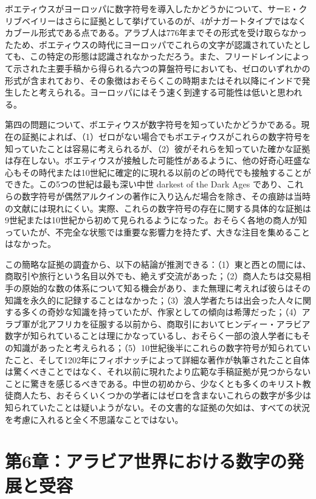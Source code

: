 \documentclass[a4paper,11pt,openany]{ltjsbook}
\begin{document}
ボエティウスがヨーロッパに数字符号を導入したかどうかについて、サーE・クリブベイリーはさらに証拠として挙げているのが、4がナガートタイプではなくカブール形式である点である。アラブ人は776年までその形式を受け取らなかったため、ボエティウスの時代にヨーロッパでこれらの文字が認識されていたとしても、この特定の形態は認識されなかっただろう。また、フリードレインによって示された主要手稿から得られる六つの算盤符号においても、ゼロのいずれかの形式が含まれており、その象徴はおそらくこの時期またはそれ以降にインドで発生したと考えられる。ヨーロッパにはそう速く到達する可能性は低いと思われる。

第四の問題について、ボエティウスが数字符号を知っていたかどうかである。現在の証拠によれば、（1）ゼロがない場合でもボエティウスがこれらの数字符号を知っていたことは容易に考えられるが、（2）彼がそれらを知っていた確かな証拠は存在しない。ボエティウスが接触した可能性があるように、他の好奇心旺盛な心もその時代または10世紀に確定的に現れる以前のどの時代でも接触することができた。この5つの世紀は最も深い中世 darkest of the Dark Ages であり、これらの数字符号が偶然アルクインの著作に入り込んだ場合を除き、その痕跡は当時の文献には現れにくい。実際、これらの数字符号の存在に関する具体的な証拠は9世紀または10世紀から初めて見られるようになった。おそらく各地の商人が知っていたが、不完全な状態では重要な影響力を持たず、大きな注目を集めることはなかった。

この簡略な証拠の調査から、以下の結論が推測できる：（1）東と西との間には、商取引や旅行という名目以外でも、絶えず交流があった；（2）商人たちは交易相手の原始的な数の体系について知る機会があり、また無理に考えれば彼らはその知識を永久的に記録することはなかった；（3）浪人学者たちは出会った人々に関する多くの奇妙な知識を持っていたが、作家としての傾向は希薄だった；（4）アラブ軍が北アフリカを征服する以前から、商取引においてヒンディー・アラビア数字が知られていることは理にかなっているし、おそらく一部の浪人学者にもその知識があったと考えられる；（5）10世紀後半にこれらの数字符号が知られていたこと、そして1202年にフィボナッチによって詳細な著作が執筆されたこと自体は驚くべきことではなく、それ以前に現れたより広範な手稿証拠が見つからないことに驚きを感じるべきである。中世の初めから、少なくとも多くのキリスト教徒商人たち、おそらくいくつかの学者にはゼロを含まないこれらの数字が多少は知られていたことは疑いようがない。その文書的な証拠の欠如は、すべての状況を考慮に入れると全く不思議なことではない。

\clearpage

\chapter{第6章：アラビア世界における数字の発展と受容}
\end{document}
